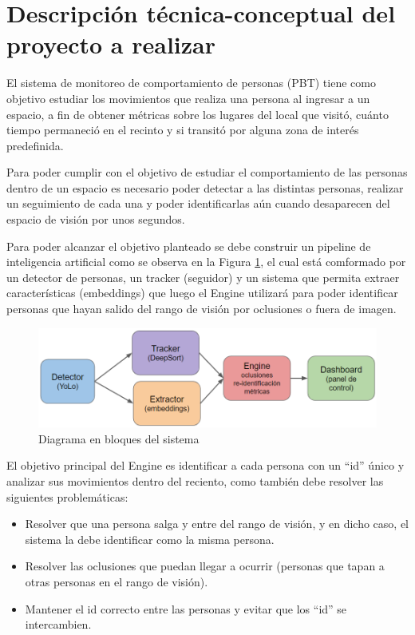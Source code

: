 \documentclass[11pt]{charter}
\begin{document}
\newpage

\section{Descripción técnica-conceptual del proyecto a realizar}
\label{sec:descripcion}

El sistema de monitoreo de comportamiento de personas (PBT) tiene como objetivo estudiar los movimientos que realiza una persona al ingresar a un espacio, a fin de obtener métricas sobre los lugares del local que visitó, cuánto tiempo permaneció en el recinto y si transitó por alguna zona de interés predefinida.

Para poder cumplir con el objetivo de estudiar el comportamiento de las personas dentro de un espacio es necesario poder detectar a las distintas personas, realizar un seguimiento de cada una y poder identificarlas aún cuando desaparecen del espacio de visión por unos segundos.

Para poder alcanzar el objetivo planteado se debe construir un pipeline de inteligencia artificial como se observa en la Figura \ref{fig:diagBloques}, el cual está comformado por un detector de personas, un tracker (seguidor) y un sistema que permita extraer características (embeddings) que luego el Engine utilizará para poder identificar personas que hayan salido del rango de visión por oclusiones o fuera de imagen.

\vspace{25px}

\begin{figure}[htpb]
\centering 
\includegraphics[width=.7\textwidth]{./Figuras/diagBloques.png}
\caption{Diagrama en bloques del sistema}
\label{fig:diagBloques}
\end{figure}

El objetivo principal del Engine es identificar a cada persona con un “id” único y analizar sus movimientos dentro del reciento, como también debe resolver las siguientes problemáticas:
\begin{itemize}
\item Resolver que una persona salga y entre del rango de visión, y en dicho caso, el sistema la debe identificar como la misma persona.
\item Resolver las oclusiones que puedan llegar a ocurrir (personas que tapan a otras personas en el rango de visión).
\item Mantener el id correcto entre las personas y evitar que los “id” se intercambien.
\end{itemize}
\end{document}
